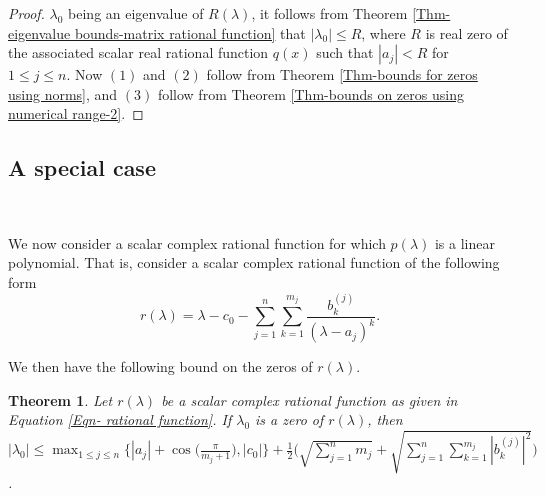 \documentclass[12pt, reqno]{amsart}
\newtheorem{theorem}{Theorem}[section]
\theoremstyle{definition}
\theoremstyle{remark}
\numberwithin{equation}{section}
\begin{document}
\begin{proof}
$\lambda_0$ being an eigenvalue of $R(\lambda)$, it follows from Theorem 
\ref{Thm-eigenvalue bounds-matrix rational function} that $|\lambda_0| \leq R$, 
where $R$ is real zero of the associated scalar real rational function $q(x)$ such 
that $|a_j| < R$ for $1 \leq j \leq n$. Now $(1)$ and $(2)$ follow from Theorem 
\ref{Thm-bounds for zeros using norms}, and $(3)$ follow from Theorem 
\ref{Thm-bounds on zeros using numerical range-2}.
\end{proof}

\subsection{A special case} 

\

We now consider a scalar complex rational function for which $p(\lambda)$ is a 
linear polynomial. That is, consider a scalar complex rational function of the 
following form
\begin{equation}\label{Eqn- rational function}
r(\lambda) = \lambda - c_0 - \displaystyle \sum_{j=1}^{n} \sum_{k=1}^{m_j} 
\frac{b_k^{(j)}}{(\lambda-a_j)^k}.
\end{equation}

We then have the following bound on the zeros of $r(\lambda)$.

\begin{theorem}\label{Thm-bounds for zeros}
Let $r(\lambda)$ be a scalar complex rational function as given in Equation 
\eqref{Eqn- rational function}. If $\lambda_0$ is a zero of $r(\lambda)$, then 
$|\lambda_0| \leq \displaystyle \max_{1\leq j \leq n} \Big\{|a_j| + 
\cos\bigg(\frac{\pi}{m_j+1}\bigg), |c_0| \Big\} + \frac{1}{2} \Bigg( 
\sqrt{\sum _{j=1}^{n}m_j} + \sqrt{\sum_{j=1}^{n} \sum_{k=1}^{m_j}|b_k^{(j)}|^{2}} \Bigg)$.
\end{theorem}
\end{document}
